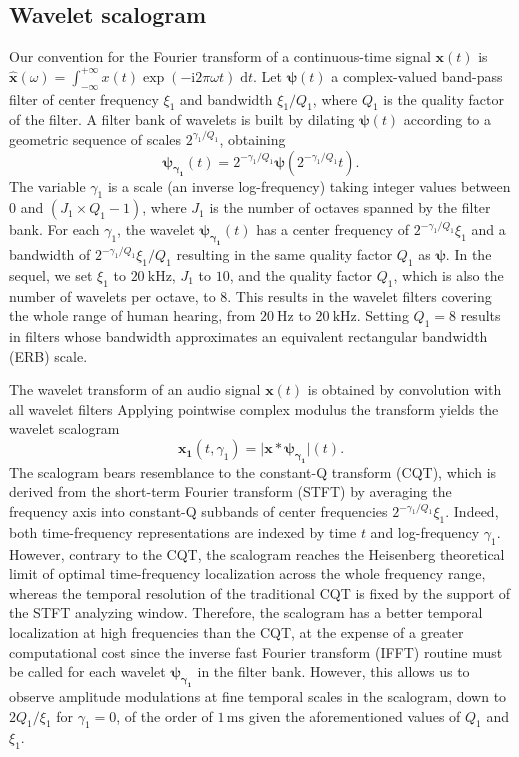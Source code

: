 \documentclass[journal]{IEEEtran}
\begin{document}
\subsection{Wavelet scalogram}
Our convention for the Fourier transform of a continuous-time signal $\boldsymbol{x}(t)$ is $\boldsymbol{\hat{x}}(\omega) = \int_{-\infty}^{+\infty} x(t) \exp(- \mathrm{i} 2\pi \omega t) \; \mathrm{d}t$.
Let $\boldsymbol{\psi}(t)$ a complex-valued band-pass filter of
center frequency $\xi_1$ and bandwidth $\xi_1/Q_1$, where $Q_1$ is the quality factor of the filter.
A filter bank of wavelets is built by dilating $\boldsymbol{\psi}(t)$
according to a geometric sequence of scales $2^{\gamma_1/Q_1}$, obtaining
\begin{equation}
\boldsymbol{\psi_{\gamma_1}}(t) = 2^{-\gamma_1/Q_1} \boldsymbol{\psi}(2^{-\gamma_1/Q_1} t)\mbox{.}
\end{equation}
The variable $\gamma_1$ is a scale (an inverse log-frequency) taking integer values between $0$ and $(J_1 \times Q_1 - 1)$, where $J_1$ is the number of octaves spanned by the filter bank.
For each $\gamma_1$, the wavelet $\boldsymbol{\psi_{\gamma_1}}(t)$
has a center frequency of $2^{-\gamma_1/Q_1}\xi_1$ and a bandwidth of $2^{-\gamma_1/Q_1}\xi_1/Q_1$ resulting in the same quality factor $Q_1$ as $\boldsymbol{\psi}$.
In the sequel, we set $\xi_1$ to $20~\mathrm{kHz}$, $J_1$ to $10$, and the quality factor $Q_1$, which is also the number of wavelets per octave, to $8$. This results in the wavelet filters covering the whole range of human hearing, from $20~\mathrm{Hz}$ to $20~\mathrm{kHz}$. Setting $Q_1 = 8$ results in filters whose bandwidth approximates an equivalent rectangular bandwidth (ERB) scale.

The wavelet transform of an audio signal
$\boldsymbol{x}(t)$ is obtained by convolution with all wavelet filters
Applying pointwise complex modulus the transform yields
the wavelet scalogram
\begin{equation}
\boldsymbol{x_1}(t, \gamma_1)
= \vert \boldsymbol{x} \ast \boldsymbol{\psi_{\gamma_1}} \vert (t)\mbox{.}
\end{equation}
The scalogram bears resemblance to the constant-Q transform (CQT),
which is derived from the short-term Fourier transform (STFT) by averaging the frequency
axis into constant-Q subbands of center frequencies $2^{-\gamma_1/Q_1}\xi_1$.
Indeed, both time-frequency representations are indexed by time $t$ and log-frequency $\gamma_1$.
However, contrary to the CQT, the scalogram reaches the Heisenberg
theoretical limit of optimal time-frequency localization across the whole
frequency range, whereas the temporal resolution of the traditional CQT is fixed by the support of the STFT analyzing window. %
Therefore, the scalogram has a better temporal localization at high
frequencies than the CQT, at the expense of a greater computational cost
since the inverse fast Fourier transform (IFFT) routine must be called for each wavelet $\boldsymbol{\psi_{\gamma_1}}$ in the filter bank.
However, this allows us to observe amplitude modulations at fine temporal scales in the scalogram, down to $2Q_1/\xi_1$ for $\gamma_1 = 0$, of the order of $1\,\textrm{ms}$ given the aforementioned values of $Q_1$ and $\xi_1$.
\end{document}
